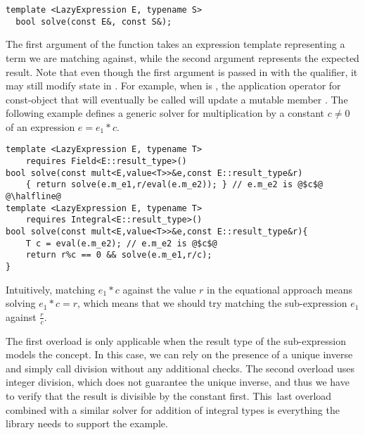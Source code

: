 \begin{lstlisting}[keepspaces]
template <LazyExpression E, typename S> 
  bool solve(const E&, const S&);
\end{lstlisting}

\noindent
The first argument of the function takes an expression template representing a 
term we are matching against, while the second argument represents the expected 
result. Note that even though the first argument is passed in with the  qualifier, 
it may still modify state in . For example, when  is 
, the application operator for const-object that will eventually be 
called will update a mutable member .
%
The following example defines a generic solver for multiplication by a 
constant $c \neq 0$ of an expression $e=e_1*c$. 

\begin{lstlisting}[keepspaces]
template <LazyExpression E, typename T> 
    requires Field<E::result_type>()
bool solve(const mult<E,value<T>>&e,const E::result_type&r)
    { return solve(e.m_e1,r/eval(e.m_e2)); } // e.m_e2 is @$c$@
@\halfline@
template <LazyExpression E, typename T>
    requires Integral<E::result_type>()
bool solve(const mult<E,value<T>>&e,const E::result_type&r){
    T c = eval(e.m_e2); // e.m_e2 is @$c$@
    return r%c == 0 && solve(e.m_e1,r/c);
}
\end{lstlisting}

\noindent
Intuitively, matching $e_1*c$ against the value $r$ in the equational approach means 
solving $e_1*c=r$, which means that we should try matching the sub-expression 
$e_1$ against $\frac{r}{c}$.

The first overload is only applicable when the result type of the 
sub-expression models the  concept. In this case, we can rely on the 
presence of a unique inverse and simply call division without any additional 
checks. The second overload uses integer division, which does not guarantee the 
unique inverse, and thus we have to verify that the result is divisible by the 
constant first. This~last overload combined with a similar solver for addition 
of integral types is everything the library needs to support the  example.

